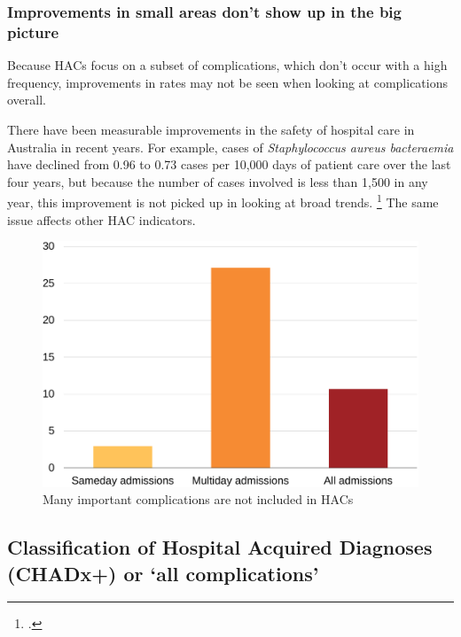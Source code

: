 \documentclass[FrontPage]{grattan}
\begin{document}
\subsubsection{Improvements in small areas don't show up in the big picture}\label{subsubsec:improvements-in-small-areas-dont-show-up-in-the-big-picture}

Because HACs focus on a subset of complications, which don't occur with a high frequency, improvements in rates may not be seen when looking at complications overall.

There have been measurable improvements in the safety of hospital care in Australia in recent years.
For example, cases of \emph{Staphylococcus aureus bacteraemia} have declined from 0.96 to 0.73 cases per 10,000 days of patient care over the last four years, but because the number of cases involved is less than 1,500 in any year, this improvement is not picked up in looking at broad trends.%
	\footcite{AIHW-2017-Admitted-patient-care-2015-16-Aust-hosp-stats}
The same issue affects other HAC indicators.

\begin{figure}
\caption{Many important complications are not included in HACs}\label{fig:many-important-complications-are-not-included-in-hacs}
\includegraphics[page=4]{atlas/comps_charts.pdf}
\end{figure} 

\subsection{Classification of Hospital Acquired Diagnoses (CHADx+) or `all complications'}\label{subsec:classification-of-hospital-acquired-diagnoses-chadx-or-all-complications}
\end{document}
